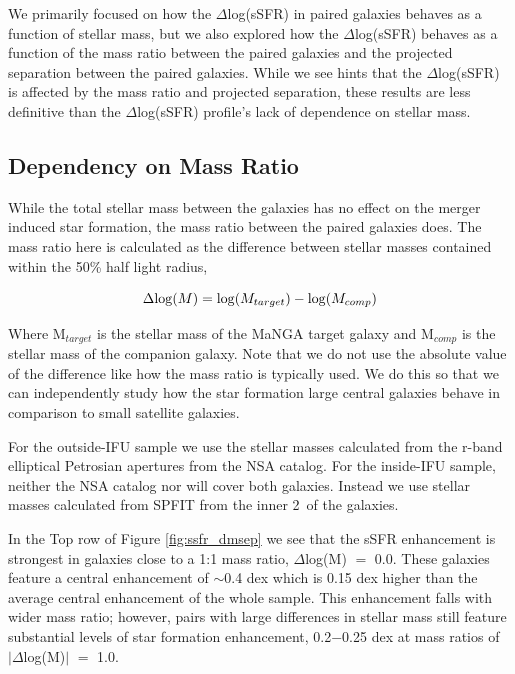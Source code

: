 \documentclass[iop,revtex4,twocolumn,apj,numberedappendix,appendixfloats]{emulateapj}
\begin{document}
We primarily focused on how the $\Delta$log(sSFR) in paired galaxies behaves as a function of stellar mass, but we also explored how the $\Delta$log(sSFR) behaves as a function of the mass ratio between the paired galaxies and the projected separation between the paired galaxies. While we see hints that the $\Delta$log(sSFR) is affected by the mass ratio and projected separation, these results are less definitive than the $\Delta$log(sSFR) profile's lack of dependence on stellar mass. 


\subsection{Dependency on Mass Ratio}
While the total stellar mass between the galaxies has no effect on the merger induced star formation, the mass ratio between the paired galaxies does. The mass ratio here is calculated as the difference between stellar masses contained within the 50\% half light radius, 

\begin{equation}
\Delta {\rm log}(M) = {\rm log}(M_{target}) - {\rm log}(M_{comp}) 
\end{equation}

Where M$_{target}$ is the stellar mass of the MaNGA target galaxy and M$_{comp}$ is the stellar mass of the companion galaxy. Note that we do not use the absolute value of the difference like how the mass ratio is typically used. We do this so that we can independently study how the star formation large central galaxies behave in comparison to small satellite galaxies.

For the outside-IFU sample we use the stellar masses calculated from the r-band elliptical Petrosian apertures from the NSA catalog. For the inside-IFU sample, neither the NSA catalog nor \citet{Mendel:2014} will cover both galaxies. Instead we use stellar masses calculated from {\sc SPFIT} from the inner 2\arcsec\ of the galaxies. 

In the Top row of Figure \ref{fig:ssfr_dmsep} we see that the sSFR enhancement is strongest in galaxies close to a 1:1 mass ratio, $\Delta$log(M) $=$ 0.0. These galaxies feature a central enhancement of $\sim$0.4 dex which is 0.15 dex higher than the average central enhancement of the whole sample. This enhancement falls with wider mass ratio; however, pairs with large differences in stellar mass still feature substantial levels of star formation enhancement, 0.2$-$0.25 dex at mass ratios of $|\Delta$log(M)$|$ $=$ 1.0.
\end{document}
